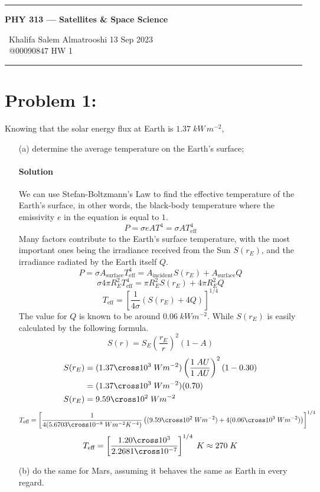 \documentclass{article}
\begin{document}
	
	\begin{center}
		\hrule
		\vspace{0.4cm}
		{\textbf { \large PHY 313 --- Satellites \& Space Science}}
		\vspace{0.4cm}
	\end{center}
	{ \ Khalifa Salem Almatrooshi \hspace{\fill}  13 Sep 2023 \\
		{ } \ @00090847 \hspace{\fill}  HW 1 \\
		\hrule	

	\section*{Problem 1: }
	\boldmath
	Knowing that the solar energy flux at Earth is $ 1.37 \; kW \, m^{-2} $, \\
	\begin{enumerate}
		\item[(a)] determine the average temperature on the Earth's surface;
		\paragraph{Solution} We can use Stefan-Boltzmann's Law to find the effective temperature of the Earth's surface, in other words, the black-body temperature where the emissivity $e$ in the equation is equal to $1$. \unboldmath  		
			\[
				P = \sigma e A T^4 = \sigma A T_{\text{eff}}^4
			\] \boldmath
			Many factors contribute to the Earth's surface temperature, with the most important ones being the irradiance received from the Sun $S(r_E)$, and the irradiance radiated by the Earth itself $Q$. \unboldmath
			\[
				P = \sigma A_{\text{surface}} T_{\text{eff}}^4 = A_{\text{incident}} S(r_E) + A_{\text{surface}} Q
			\]
			\[
				\sigma 4\pi R_E^2 T_{\text{eff}}^4 = \pi R_E^2 S(r_E) + 4\pi R_E^2 Q
			\]
			\[
				T_{\text{eff}} = \left[ \frac{1}{4\sigma } \left(S(r_E) + 4Q\right) \right]^{1/4}	
			\] \boldmath
			The value for $Q$ is known to be around $0.06 \; kW m^{-2}$. While $S(r_E)$ is easily calculated by the following formula. \unboldmath
			\[
				S(r) = S_E \left( \frac{r_E}{r} \right)^2 (1 - A)
			\]
			\begin{equation*}
				\begin{split}
					S(r_E) &= ( 1.37 \cross 10^3 \; W m^{-2}) \left( \frac{1 \; AU}{1 \; AU} \right)^2 ( 1 - 0.30 ) \\
					&= ( 1.37 \cross 10^3 \; W m^{-2}) ( 0.70 ) \\
					S(r_E) &= 9.59 \cross 10^2 \; W m^{-2} \\
				\end{split}
			\end{equation*}
			\[
				T_{\text{eff}} = \left[ \frac{1}{4 (5.6703 \cross 10^{-8} \; Wm^{-2}K^{-4} ) } \left( (9.59 \cross 10^2 \; W m^{-2}) + 4(0.06 \cross 10^3 \; W m^{-2}) \right) \right]^{1/4}	
			\]
			\[
				T_{\text{eff}} = \left[ \frac{1.20 \cross 10^3}{2.2681 \cross 10^{-7}} \right]^{1/4} \; K \approx 270 \; K
			\]
		\boldmath
		\item[(b)] do the same for Mars, assuming it behaves the same as Earth in every regard.

\end{enumerate}}
\end{document}
